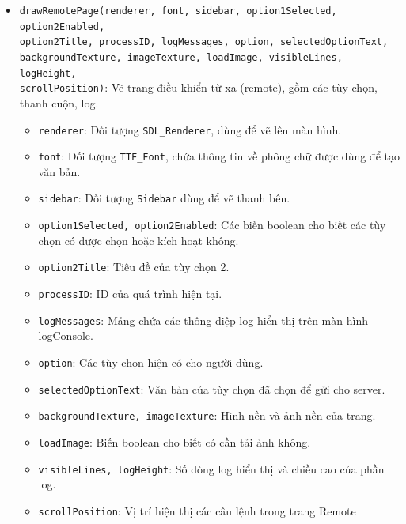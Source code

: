 \begin{itemize}
    \item \texttt{drawRemotePage(renderer, font, sidebar, option1Selected, option2Enabled, \\option2Title, processID, logMessages, option, selectedOptionText, \\backgroundTexture, imageTexture, loadImage, visibleLines, logHeight, \\scrollPosition)}: Vẽ trang điều khiển từ xa (remote), gồm các tùy chọn, thanh cuộn, log.
    \begin{itemize}
        \item \texttt{renderer}: Đối tượng \texttt{SDL\_Renderer}, dùng để vẽ lên màn hình.
        \item \texttt{font}: Đối tượng \texttt{TTF\_Font}, chứa thông tin về phông chữ được dùng để tạo văn bản.
        \item \texttt{sidebar}: Đối tượng \texttt{Sidebar} dùng để vẽ thanh bên.
        \item \texttt{option1Selected, option2Enabled}: Các biến boolean cho biết các tùy chọn có được chọn hoặc kích hoạt không.
        \item \texttt{option2Title}: Tiêu đề của tùy chọn 2.
        \item \texttt{processID}: ID của quá trình hiện tại.
        \item \texttt{logMessages}: Mảng chứa các thông điệp log hiển thị trên màn hình logConsole.
        \item \texttt{option}: Các tùy chọn hiện có cho người dùng.
        \item \texttt{selectedOptionText}:  Văn bản của tùy chọn đã chọn để gửi cho server.
        \item \texttt{backgroundTexture, imageTexture}: Hình nền và ảnh nền của trang.
        \item \texttt{loadImage}: Biến boolean cho biết có cần tải ảnh không.
        \item \texttt{visibleLines, logHeight}: Số dòng log hiển thị và chiều cao của phần log.
        \item \texttt{scrollPosition}: Vị trí hiện thị các câu lệnh trong trang Remote

    \end{itemize}
    

\end{itemize}
